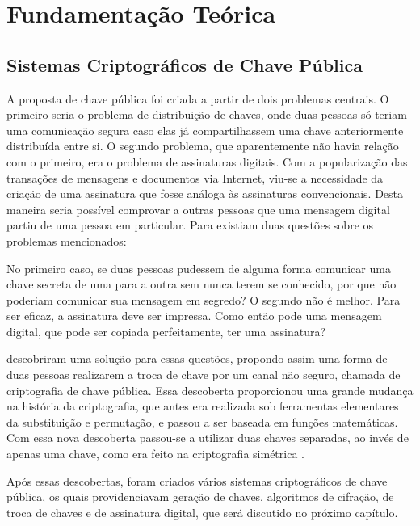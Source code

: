\chapter[Fundamentação Teórica]{Fundamentação Teórica}
\section{Sistemas Criptográficos de Chave Pública}

A proposta de chave pública foi criada a partir de dois problemas centrais. O primeiro seria o problema de distribuição de chaves, onde duas pessoas só teriam uma comunicação segura caso elas já compartilhassem uma chave anteriormente distribuída entre si. O segundo problema, que aparentemente não havia relação com o primeiro, era o problema de assinaturas digitais. Com a popularização das transações de mensagens e documentos via Internet, viu-se a necessidade da criação de uma assinatura que fosse análoga às assinaturas convencionais. Desta maneira seria possível comprovar a outras pessoas que uma mensagem digital partiu de uma pessoa em particular. Para  existiam duas questões sobre os problemas mencionados:

\begin{citacao}
No primeiro caso, se duas pessoas pudessem de alguma forma comunicar uma chave secreta de uma para a outra sem nunca terem se conhecido, por que não poderiam comunicar sua mensagem em segredo? O segundo não é melhor. Para ser eficaz, a assinatura deve ser impressa. Como então pode uma mensagem digital, que pode ser copiada perfeitamente, ter uma assinatura?
\end{citacao}

 descobriram uma solução para essas questões, propondo assim uma forma de duas pessoas realizarem a troca de chave por um canal não seguro, chamada de criptografia de chave pública. Essa descoberta proporcionou uma grande mudança na história da criptografia, que antes era realizada sob ferramentas elementares da substituição e permutação, e passou a ser baseada em funções matemáticas. Com essa nova descoberta passou-se a utilizar duas chaves separadas, ao invés de apenas uma chave, como era feito na criptografia simétrica \cite{stallings2014}.

Após essas descobertas, foram criados vários sistemas criptográficos de chave pública, os quais providenciavam geração de chaves, algoritmos de cifração, de troca de chaves e de assinatura digital, que será discutido no próximo capítulo.

